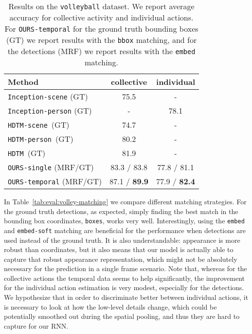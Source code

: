 \documentclass[10pt,twocolumn,letterpaper]{article}
\newcommand{\smttt}[1]{{\small{\texttt{#1}}}}
\begin{document}
\begin{table}[ht!]
\vspace{-0.25cm}
\begin{center}
\begin{tabular}{|l|c|c|}
\hline
Method                    & collective & individual \\\hline
\smttt{Inception-scene} (GT)  &  75.5      &  -       \\
\smttt{Inception-person} (GT) &   -        &  78.1    \\\hline
\smttt{HDTM-scene}~\cite{Ibrahim2016}(GT) & 74.7 & - \\
\smttt{HDTM-person}~\cite{Ibrahim2016}(GT) & 80.2  & - \\
\smttt{HDTM}~\cite{Ibrahim2016}(GT) & 81.9  & - \\\hline
\smttt{OURS-single} (MRF/GT) & 83.3 / 83.8  & 77.8 / 81.1  \\
\smttt{OURS-temporal} (MRF/GT) &  87.1 / \textbf{89.9} & 77.9 / \textbf{82.4} \\\hline
\end{tabular}
\end{center}
\caption{Results on the \texttt{volleyball} dataset. We report average accuracy
  for collective activity and individual actions. For \texttt{OURS-temporal}
  for the ground truth bounding boxes (GT) we report results with the \texttt{bbox}
  matching, and for the detections (MRF) we report results with the 
  \texttt{embed} matching.}
 \label{tab:eval:volley-baselines}
 \vspace{-0.25cm}
\end{table}


In Table~\ref{tab:eval:volley-matching} we compare different matching
strategies. For the ground truth detections, as expected, simply finding the
best match in the bounding box coordinates, \texttt{boxes}, works very well.
Interestingly, using the \texttt{embed} and \texttt{embed-soft} matching are beneficial
for the performance when detections are used instead of the ground truth. It is also
understandable: appearance is more robust than coordinates, but it also
means that our model is actually able to capture that robust appearance
representation, which might not be absolutely necessary for the prediction in a
single frame scenario. Note that, whereas for the collective actions the 
temporal data seems to help significantly, the improvement for the individual action
estimation is very modest, especially for the detections. We hypothesize that in order to
discriminate better between individual actions, it is
necessary to look at how the low-level details change, which could be potentially 
smoothed out during the spatial pooling, and thus they are hard to capture for our 
RNN. 
\end{document}
